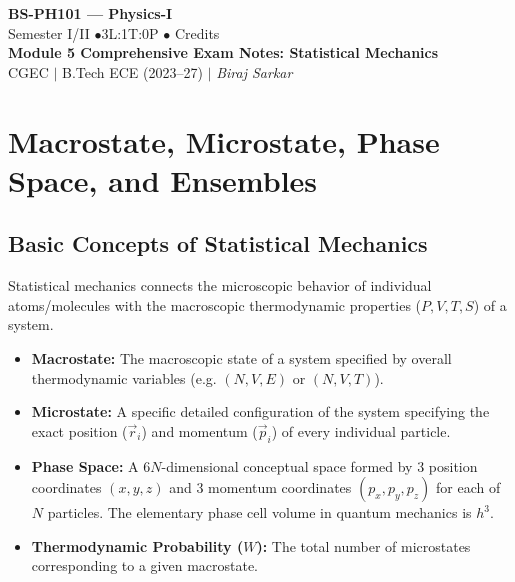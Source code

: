 \documentclass[12pt,a4paper]{article}
\begin{document}
\begin{center}
  {\LARGE\bfseries\color{myred} BS-PH101 --- Physics-I}\\[5pt]
  {\normalsize\color{mydark} Semester I/II \quad$\bullet$\quad 3L:1T:0P \quad$\bullet$ Credits}\\[3pt]
  {\normalsize\color{myteal}\textbf{Module 5 Comprehensive Exam Notes: Statistical Mechanics}}\\[3pt]
  {\small\color{mydark} CGEC \;$|$\; B.Tech ECE (2023--27) \;$|$\; \textit{Biraj Sarkar}}
\end{center}
\vspace{2pt}
\noindent{\color{myred}\rule{\linewidth}{1.5pt}}
\vspace{2pt}
\hypersetup{linkcolor=mydark}
\tableofcontents
\hypersetup{linkcolor=myteal}
\newpage

\section{Macrostate, Microstate, Phase Space, and Ensembles}

\subsection{Basic Concepts of Statistical Mechanics}

Statistical mechanics connects the microscopic behavior of individual atoms/molecules with the macroscopic thermodynamic properties ($P, V, T, S$) of a system.

\begin{tcolorbox}[defbox, title={\textbf{Definitions: Macrostate, Microstate, and Phase Space}}]
\begin{itemize}[leftmargin=*, itemsep=2pt]
  \item \textbf{Macrostate:} The macroscopic state of a system specified by overall thermodynamic variables (e.g. $(N, V, E)$ or $(N, V, T)$).
  \item \textbf{Microstate:} A specific detailed configuration of the system specifying the exact position ($\vec{r}_i$) and momentum ($\vec{p}_i$) of every individual particle.
  \item \textbf{Phase Space:} A $6N$-dimensional conceptual space formed by 3 position coordinates $(x,y,z)$ and 3 momentum coordinates $(p_x,p_y,p_z)$ for each of $N$ particles. The elementary phase cell volume in quantum mechanics is $h^3$.
  \item \textbf{Thermodynamic Probability ($W$):} The total number of microstates corresponding to a given macrostate.
\end{itemize}
\end{tcolorbox}
\end{document}
